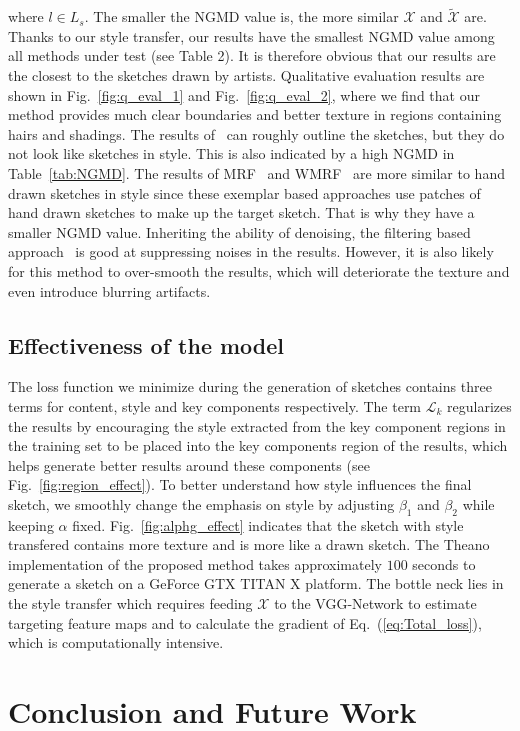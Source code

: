 \documentclass[10pt,twocolumn,letterpaper]{article}
\begin{document}
where $l\in L_s$. The smaller the NGMD value is, the more similar $\mathcal{X}$ and ${\tilde {\mathcal{X}}}$ are. Thanks to our style transfer, our results have the smallest NGMD value among all methods under test (see Table 2). It is therefore obvious that our results are the closest to the sketches drawn by artists. 
Qualitative evaluation results are shown in Fig.~\ref{fig:q_eval_1} and Fig.~\ref{fig:q_eval_2}, where we find that our method provides much clear boundaries and better texture in regions containing hairs and shadings. The results of~\cite{zhang2015end} can roughly outline the sketches, but they do not look like sketches in style. This is also indicated by a high NGMD in Table~\ref{tab:NGMD}. The results of MRF~\cite{wang2009face} and WMRF~\cite{zhou2012markov} are more similar to hand drawn sketches in style since these exemplar based approaches use patches of hand drawn sketches to make up the target sketch. That is why they have a smaller NGMD value. Inheriting the ability of denoising, the filtering based approach~\cite{song2014real} is good at suppressing noises in the results. However, it is also likely for this method to over-smooth the results, which will deteriorate the texture and even introduce blurring artifacts. 
{
\subsection{Effectiveness of the model}
}
The loss function we minimize during the generation of sketches contains three terms for content, style and key components respectively. The term $\mathcal{L}_{k} $ regularizes the results by encouraging the style extracted from the key component regions in the training set to be placed into the key components region of the results, which helps generate better results around these components (see Fig.~\ref{fig:region_effect}). To better understand how style influences the final sketch, we smoothly change the emphasis on style by adjusting $\beta_1$ and $\beta_2$ while keeping $\alpha$  fixed. Fig.~\ref{fig:alphg_effect} indicates that the sketch with style transfered contains more texture and is more like a drawn sketch. The Theano implementation of the proposed method takes approximately $100$ seconds to generate a sketch on a GeForce GTX TITAN X platform. The bottle neck lies in the style transfer which requires feeding $\mathcal{X}$ to the VGG-Network to estimate targeting feature maps and to calculate the gradient of Eq.~(\ref{eq:Total_loss}), which is computationally intensive. 
{
\section{Conclusion and Future Work}
}
\end{document}
